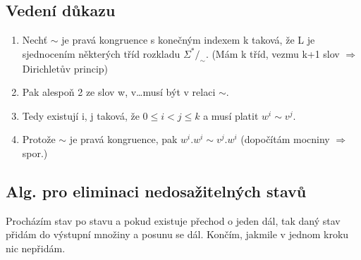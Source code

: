 \documentclass[a4paper]{article}
\begin{document}
\subsection*{Vedení důkazu}
\begin{enumerate}
    \item Nechť \(\sim \) je pravá kongruence s konečným indexem k taková, že L je sjednocením některých tříd rozkladu \( \Sigma^* /_\sim \). (Mám k tříd, vezmu k+1 slov \(\Rightarrow \) Dirichletův princip)
    \item Pak alespoň 2 ze slov w, v\ldots musí být v relaci \(\sim \).
    \item Tedy existují i, j taková, že \( 0 \leq i < j \leq k\) a musí platit \( w^i \sim v^j \).
    \item Protože \(\sim \) je pravá kongruence, pak \( w^i.w^i \sim v^j.w^i\) (dopočítám mocniny \(\Rightarrow \) spor.)
\end{enumerate}
\subsection*{Alg. pro eliminaci nedosažitelných stavů}
Procházím stav po stavu a pokud existuje přechod o jeden dál, tak daný stav přidám do výstupní množiny a posunu se dál. Končím, jakmile v jednom kroku nic nepřidám.
\end{document}
